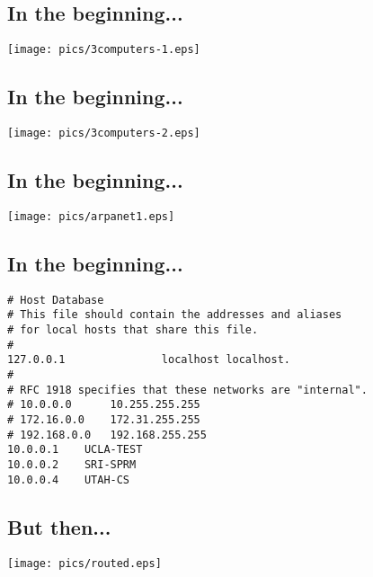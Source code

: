 \documentclass[xga]{xdvislides}
\begin{document}
\subsection{In the beginning...}
\vspace*{\fill}
\begin{center}
	\texttt{[image: pics/3computers-1.eps]} \\
\end{center}
\vspace*{\fill}

\subsection{In the beginning...}
\vspace*{\fill}
\begin{center}
	\texttt{[image: pics/3computers-2.eps]} \\
\end{center}
\vspace*{\fill}

\subsection{In the beginning...}
\vspace*{\fill}
\begin{center}
	\texttt{[image: pics/arpanet1.eps]} \\
\end{center}
\vspace*{\fill}


\subsection{In the beginning...}
\begin{verbatim}
# Host Database
# This file should contain the addresses and aliases
# for local hosts that share this file.
#
127.0.0.1               localhost localhost.
#
# RFC 1918 specifies that these networks are "internal".
# 10.0.0.0      10.255.255.255
# 172.16.0.0    172.31.255.255
# 192.168.0.0   192.168.255.255
10.0.0.1	UCLA-TEST
10.0.0.2	SRI-SPRM
10.0.0.4	UTAH-CS
\end{verbatim}


\subsection{But then...}
\vspace*{\fill}
\begin{center}
	\texttt{[image: pics/routed.eps]} \\
\end{center}
\vspace*{\fill}
\end{document}

